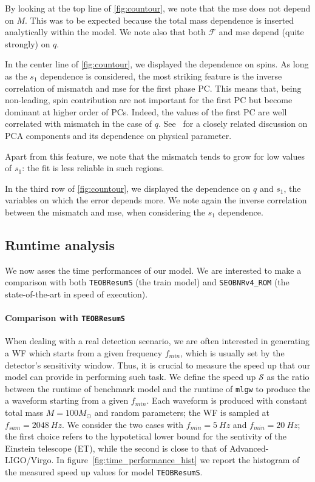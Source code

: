 \par
By looking at the top line of \ref{fig:countour}, we note that the mse does not depend on $M$. This was to be expected because the total mass dependence is inserted analytically within the model.
We note also that both $\mathcal{F}$ and mse depend (quite strongly) on $q$.
\par
In the center line of \ref{fig:countour}, we displayed the dependence on spins.
As long as the $s_1$ dependence is considered, the most striking feature is the inverse correlation of mismatch and mse for the first phase PC.
This means that, being non-leading, spin contribution are not important for the first PC but become dominant at higher order of PCs.
Indeed, the values of the first PC are well correlated with mismatch in the case of $q$. See~\cite{Ohme2013PCA_GW} for a closely related discussion on PCA components and its dependence on physical parameter.
\par
Apart from this feature, we note that the mismatch tends to grow for low values of $s_1$: the fit is less reliable in such regions.
\par
In the third row of \ref{fig:countour}, we displayed the dependence on $q$ and $s_1$, the variables on which the error depends more.
We note again the inverse correlation between the mismatch and mse, when considering the $s_1$ dependence.
\subsection{Runtime analysis} \label{sec:runtime}
We now asses the time performances of our model.
We are interested to make a comparison with both \texttt{TEOBResumS} (the train model) and \texttt{SEOBNRv4\_ROM} \cite{} (the state-of-the-art in speed of execution).
\paragraph{Comparison with \texttt{TEOBResumS}}
When dealing with a real detection scenario, we are often interested in generating a WF which starts from a given frequency $f_{min}$, which is usually set by the detector's sensitivity window. Thus, it is crucial to measure the speed up that our model can provide in performing such task.
We define the speed up $\mathcal{S}$ as the ratio between the runtime of benchmark model and the runtime of \texttt{mlgw} to produce the a waveform starting from a given $f_{min}$. Each waveform is produced with constant total mass $M = 100 M_{\odot}$ and random parameters; the WF is sampled at $f_{sam} = \SI{2048}{Hz}$.
We consider the two cases with $f_{min} = \SI{5}{Hz}$ and $f_{min} = \SI{20}{Hz}$; the first choice refers to the hypotetical lower bound for the sentivity of the Einstein telescope (ET), while the second is close to that of Advanced-LIGO/Virgo.
In figure~\ref{fig:time_performance_hist} we report the histogram of the measured speed up values for model \texttt{TEOBResumS}.

